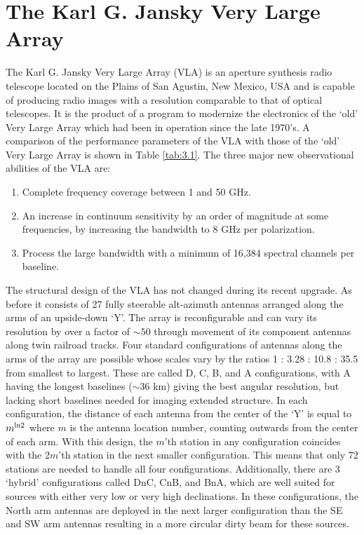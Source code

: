 \section{The Karl G. Jansky Very Large Array}\label{sec:3.5}
The Karl G. Jansky Very Large Array (VLA) is an aperture synthesis radio telescope located on the Plains of San Agustin, New Mexico, USA and is capable of producing radio images with a resolution comparable to that of optical telescopes. It is the product of a program to modernize the electronics of the `old' Very Large Array which had been in operation since the late 1970's. A comparison of the performance parameters of the VLA with those of the `old' Very Large Array is shown in Table \ref{tab:3.1}. The three major new observational abilities of the VLA are:
\begin{enumerate}
\item Complete frequency coverage between 1 and 50 GHz.
\item An increase in continuum sensitivity by an order of magnitude at some frequencies, by increasing the bandwidth to 8 GHz per polarization.
\item Process the large bandwidth with a minimum of 16,384 spectral channels per baseline.
\end{enumerate}

The structural design of the VLA has not changed during its recent upgrade. As before it consists of 27 fully steerable alt-azimuth antennas arranged along the arms of an upside-down `Y'.  The array is reconfigurable and can vary its resolution by over a factor of $\sim 50$ through movement of its component antennas along twin railroad tracks. Four standard configurations of antennas along the arms of the array are possible whose scales vary by the ratios 1 : 3.28 : 10.8 : 35.5 from smallest to largest. These are called D, C, B, and A configurations, with A having the longest baselines ($\sim 36$ km) giving the best angular resolution, but lacking short baselines needed for imaging extended structure. In each configuration, the distance of each antenna from the center of the `Y' is equal to $m^{\rm{ln}2}$ where $m$ is the antenna location number, counting outwards from the center of each arm. With this design, the $m$'th station in any configuration coincides with the 2$m$'th station in the next smaller configuration. This means that only 72 stations are needed to handle all four configurations. Additionally, there are 3 `hybrid' configurations called DnC, CnB, and BnA, which are well suited for sources with either very low or very high declinations. In these configurations, the North arm antennas are deployed in the next larger configuration than the SE and SW arm antennas resulting in a more circular dirty beam for these sources.

